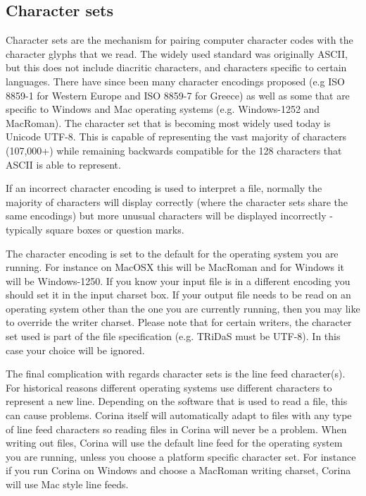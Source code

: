 \subsection{Character sets}
\label{txt:characterSets}
Character sets are the
mechanism for pairing computer character codes with the character glyphs that we read. The widely
used standard was originally ASCII, but this does not include diacritic characters, and characters specific
to certain languages. There have since been many character encodings proposed (e.g ISO 8859-1 for
Western Europe and ISO 8859-7 for Greece) as well as some that are specific to Windows and Mac
operating systems (e.g. Windows-1252 and MacRoman). The character set that is becoming most widely
used today is Unicode UTF-8. This is capable of representing the vast majority of characters (107,000+) while remaining
backwards compatible for the 128 characters that ASCII is able to represent.

If an incorrect character encoding is used to interpret a file, normally the majority of characters will display
correctly (where the character sets share the same encodings) but more unusual characters will be displayed
incorrectly - typically square boxes or question marks.

The character encoding is set to the default for the operating system you are running. For instance on
MacOSX this will be MacRoman and for Windows it will be Windows-1250. If you know your input file
is in a different encoding you should set it in the input charset box. If your output file needs to be read
on an operating system other than the one you are currently running, then you may like to override the
writer charset. Please note that for certain writers, the character set used is part of the file specification
(e.g. TRiDaS must be UTF-8). In this case your choice will be ignored.

The final complication with regards character sets is the line feed character(s). For historical reasons
different operating systems use different characters to represent a new line. Depending on the software
that is used to read a file, this can cause problems. Corina itself will automatically adapt to files with
any type of line feed characters so reading files in Corina will never be a problem. When writing
out files, Corina will use the default line feed for the operating system you are running, unless you
choose a platform specific character set. For instance if you run Corina on Windows and choose a
MacRoman writing charset, Corina will use Mac style line feeds.


